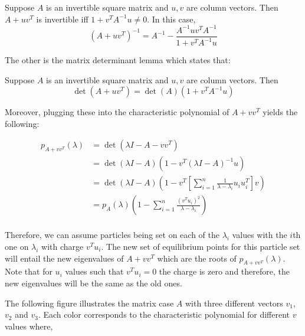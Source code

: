 \documentclass[
  letterpaper,
  DIV=11,
  numbers=noendperiod]{scrartcl}
\theoremstyle{plain}
\theoremstyle{plain}
\theoremstyle{plain}
\theoremstyle{definition}
\theoremstyle{remark}
\begin{document}
\leavevmode{}%
Suppose \(A\) is an invertible square matrix and \(u, v\) are column
vectors. Then \(A + uv^T\) is invertible iff
\(1 + v^T A^{-1} u \neq 0\). In this case,
\[(A + uv^T)^{-1} = A^{-1} - \frac{A^{-1}uv^TA^{-1}}{1 + v^TA^{-1}u}\]

The other is the matrix determinant lemma which states that:

\leavevmode{}%
Suppose \(A\) is an invertible square matrix and \(u, v\) are column
vectors. Then \[\det(A + uv^T) = \det(A) (1 + v^T A^{-1} u)\]

Moreover, plugging these into the characteristic polynomial of
\(A + vv^T\) yields the following:

\begin{align*}
p_{A + vv^T}(\lambda) &= \det(\lambda I - A - vv^T) \\
& = \det(\lambda I - A) (1 - v^T \left(\lambda I - A \right)^{-1}u) \\
& = \det (\lambda I - A) \left(1 - v^T \left[\sum_{i=1}^n \frac{1}{\lambda - \lambda_i} u_i u_i^T\right] v\right)\\
& = p_A(\lambda) \left(1 -  \sum_{i=1}^n \frac{(v^Tu_i)^2}{\lambda - \lambda_i}\right)\\
\end{align*}

Therefore, we can assume particles being set on each of the
\(\lambda_i\) values with the \(i\)th one on \(\lambda_i\) with charge
\(v^Tu_i\). The new set of equilibrium points for this particle set will
entail the new eigenvalues of \(A + vv^T\) which are the roots of
\(p_{A + vv^T}(\lambda)\). Note that for \(u_i\) values such that
\(v^Tu_i=0\) the charge is zero and therefore, the new eigenvalues will
be the same as the old ones.

The following figure illustrates the matrix case \(A\) with three
different vectors \(v_1\), \(v_2\) and \(v_3\). Each color corresponds
to the characteristic polynomial for different \(v\) values where,
\end{document}
